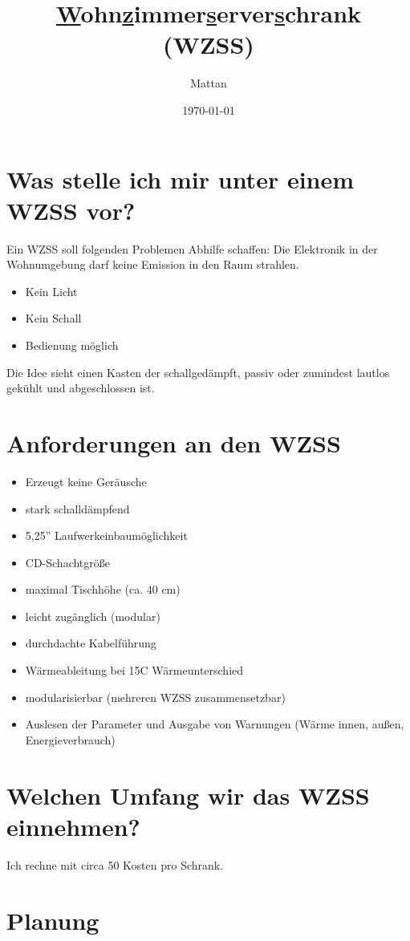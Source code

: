 \documentclass[10pt,a4paper]{scrartcl}%
\date{\today}
\author{Mattan}
\title{\underline{W}ohn\underline{z}immer\underline{s}erver\underline{s}chrank (WZSS)}
\def\inch#1{#1''}
\begin{document}
\maketitle

\section{Was stelle ich mir unter einem WZSS vor?}
Ein WZSS soll folgenden Problemen Abhilfe schaffen:
Die Elektronik in der Wohnumgebung darf keine Emission in den Raum strahlen. 
\begin{itemize}
\item Kein Licht
\item Kein Schall
\item Bedienung möglich
\end{itemize}
Die Idee sieht einen Kasten der schallgedämpft, passiv oder zumindest lautlos gekühlt und abgeschlossen ist.


\section{Anforderungen an den WZSS}

\begin{itemize}
		\item Erzeugt keine Geräusche
		\item stark schalldämpfend
		\item \inch{5,25} Laufwerkeinbaumöglichkeit
		\item CD-Schachtgröße 
		\item maximal Tischhöhe (ca. 40 cm)
		\item leicht zugänglich (modular)
		\item durchdachte Kabelführung
		\item Wärmeableitung bei 15\degree C Wärmeunterschied
		\item modularisierbar (mehreren WZSS zusammensetzbar)
		\item Auslesen der Parameter und Ausgabe von Warnungen (Wärme innen, außen, Energieverbrauch)
\end{itemize}
\section{Welchen Umfang wir das WZSS einnehmen?}

Ich rechne mit circa 50 \texteuro Kosten pro Schrank. 
\section{Planung}
\end{document}
